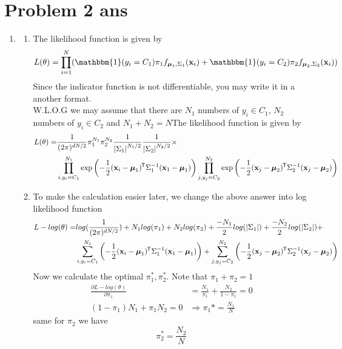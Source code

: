 \documentclass{article}
\newcommand*{\tran}{^{\mkern-1.5mu\mathsf{T}}}
\def\vecx{{\mathbf x}}
\def\vecmu{{\boldsymbol \mu}}
\def\matSigma{{\mathbf{\mathrm{\Sigma}}}}
\begin{document}
\section*{Problem 2 ans}
\begin{enumerate}[label=(\alph*)]
    \item
    \begin{enumerate}[label=(\roman*)]
        \item The likelihood function is given by
        \[
        L(\theta) = \prod_{i=1}^{N}(\mathbbm{1}(y_i=C_1)\pi_1 f_{\vecmu_1,\matSigma_1}(\vecx_i) + \mathbbm{1}(y_i=C_2)\pi_2 f_{\vecmu_2,\matSigma_2}(\vecx_i))
        \]
        Since the indicator function is not differentiable, you may write it in a another format.\\
        W.L.O.G we may assume that there are $N_1$ numbers of $y_i \in C_1$, $N_2$ numbers of $y_i \in C_2$ and $N_1+N_2=N$The likelihood function is given by
        \begin{align*}
        L(\theta) = &\frac{1}{(2\pi)^{dN/2}}\pi_1^{N_1}\pi_2^{N_2}\frac{1}{\left| \matSigma_1 \right|^{N_1/2}}\frac{1}{\left| \matSigma_2 \right|^{N_2/2}}\times\\
        &\prod_{i,y_i=C_1}^{N_1}\exp\left(-\frac{1}{2}(\vecx_i-\vecmu_1)\tran \matSigma_1^{-1}(\vecx_1-\vecmu_1)\right) \prod_{j,y_j=C_2}^{N_2}\exp\left(-\frac{1}{2}(\vecx_j-\vecmu_2)\tran \matSigma_2^{-1}(\vecx_j-\vecmu_2)\right)
        \end{align*}
        \item To make the calculation easier later, we change the above answer into log likelihood function
        \begin{align*}
        L-log(\theta) = &log(\frac{1}{(2\pi)^{dN/2}})+N_1log(\pi_1)+N_2log(\pi_2) +\frac{-N_1}{2}log(\left| \matSigma_1 \right|)+\frac{-N_2}{2}log(\left| \matSigma_2 \right|)+\\
        &\sum_{i,y_i=C_1}^{N_1}\left(-\frac{1}{2}(\vecx_i-\vecmu_1)\tran \matSigma_1^{-1}(\vecx_1-\vecmu_1)\right)+\sum_{j,y_j=C_2}^{N_2}\left(-\frac{1}{2}(\vecx_j-\vecmu_2)\tran\matSigma_2^{-1}(\vecx_j-\vecmu_2)\right)
        \end{align*}
        Now we calculate the optimal $\pi_1^*,\pi_2^*$. Note that $\pi_1+\pi_2=1$
        \begin{align*}
        \frac{\partial L-log(\theta)}{\partial \pi_1} &=\frac{N_1}{\pi_1} + \frac{N_2}{1-\pi_1}=0\\
        (1-\pi_1)N_1+\pi_1 N_2 =0& \Rightarrow \pi_1*=\frac{N_1}{N}
        \end{align*}
        same for $\pi_2$ we have \[\pi_2^*=\frac{N_2}{N}\]


\end{enumerate}
\end{enumerate}
\end{document}
